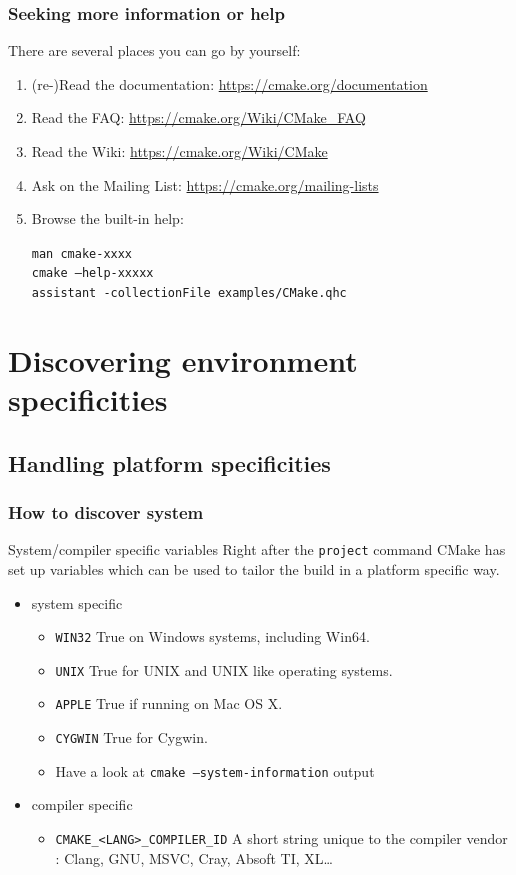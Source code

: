 \documentclass[compress,slidestop,table
              ]
               {beamer}
\newcommand{\fname}[1]{\texttt{#1}}
\begin{document}
\begin{frame}[fragile]
\frametitle{Seeking more information or help}
There are several places you can go by yourself:
\begin{enumerate}
\item {\tiny(re-)}Read the documentation: \url{https://cmake.org/documentation}
\item Read the FAQ: \url{https://cmake.org/Wiki/CMake_FAQ}
\item Read the Wiki: \url{https://cmake.org/Wiki/CMake}
\item Ask on the Mailing List: \url{https://cmake.org/mailing-lists}
\item Browse the built-in help:

     \fname{man cmake-xxxx}\\
     \fname{cmake --help-xxxxx}\\
     \fname{assistant -collectionFile examples/CMake.qhc}
\end{enumerate}
\end{frame}

\section{Discovering environment specificities}
\subsection{Handling platform specificities}
\begin{frame}[fragile]
\frametitle{How to discover system}
\begin{block}{System/compiler specific variables}
Right after the \lstinline!project! command CMake has set up variables which can be used to tailor
the build in a platform specific way.
\end{block}
\lstset{basicstyle=\small}
\begin{itemize}
\item system specific
\begin{itemize}
\item \lstinline!WIN32! True on Windows systems, including Win64.
\item \lstinline!UNIX! True for UNIX and UNIX like operating systems.
\item \lstinline!APPLE! True if running on Mac OS X.
\item \lstinline!CYGWIN! True for Cygwin.
\item Have a look at \fname{cmake --system-information} output
\end{itemize}
\item compiler specific
\begin{itemize}
\item \lstinline!CMAKE_<LANG>_COMPILER_ID! A short string unique to the compiler vendor : Clang, GNU, MSVC, Cray, Absoft TI, XL\ldots
\end{itemize}
\end{itemize}
\lstset{basicstyle=\normalsize}
\end{frame}
\end{document}
